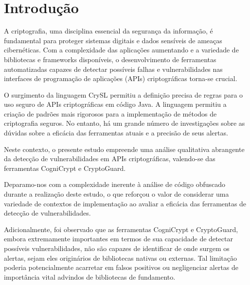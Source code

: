 

\section{Introdução}%

A criptografia, uma disciplina essencial da segurança da informação, é fundamental para proteger sistemas digitais e dados sensíveis de ameaças cibernéticas. Com a complexidade das aplicações aumentando e a variedade de bibliotecas e frameworks disponíveis, o desenvolvimento de ferramentas automatizadas capazes de detectar possíveis falhas e vulnerabilidades nas interfaces de programação de aplicações (APIs) criptográficas torna-se crucial.

O surgimento da linguagem CrySL permitiu a definição precisa de regras para o uso seguro de APIs criptográficas em código Java. A linguagem permitiu a criação de padrões mais rigorosos para a implementação de métodos de criptografia seguros. No entanto, há um grande número de investigações sobre as dúvidas sobre a eficácia das ferramentas atuais e a precisão de seus alertas.

Neste contexto, o presente estudo empreende uma análise qualitativa abrangente da detecção de vulnerabilidades em APIs criptográficas, valendo-se das ferramentas CogniCrypt e CryptoGuard.

Deparamo-nos com a complexidade inerente à análise de código obfuscado durante a realização deste estudo, o que reforçou o valor de considerar uma variedade de contextos de implementação ao avaliar a eficácia das ferramentas de detecção de vulnerabilidades.

Adicionalmente, foi observado que as ferramentas CogniCrypt e CryptoGuard, embora extremamente importantes em termos de sua capacidade de detectar possíveis vulnerabilidades, não são capazes de identificar de onde surgem os alertas, sejam eles originários de bibliotecas nativas ou externas. Tal limitação poderia potencialmente acarretar em falsos positivos ou negligenciar alertas de importância vital advindos de bibliotecas de fundamento.

